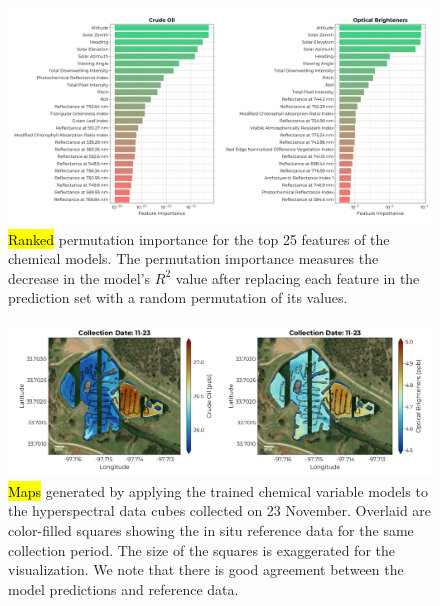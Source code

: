 \documentclass[remotesensing,article,accept,pdftex,moreauthors]{Definitions/mdpi}
\begin{document}
\vspace{-9pt}
\begin{figure}[H]
\vspace{-0.15in}
\hspace{-6pt}\includegraphics[width=\columnwidth]{figures/results/fits/chemical-ranking.pdf}
\vspace{-0.15in}
\caption{\hl{Ranked} %
 permutation importance for the top 25 features of the chemical models. The permutation importance measures the decrease in the model's $R^2$ value after replacing each feature in the prediction set with a random permutation of its values.\label{fig:chemicals-fi}}
\end{figure}  

\begin{figure}[H]

\vspace{-0.2in}
\hspace{-6pt}\includegraphics[width=\columnwidth]{figures/results/maps/chemical.pdf}
\vspace{-0.1in}
\caption{\hl{Maps} %
 generated by applying the trained chemical variable models to the hyperspectral data cubes collected on 23 November. Overlaid are color-filled squares showing the in situ reference data for the same collection period. The size of the squares is exaggerated for the visualization. We note that there is good agreement between the model predictions and reference data.\label{fig:map-chem}}
\end{figure} 
\end{document}
